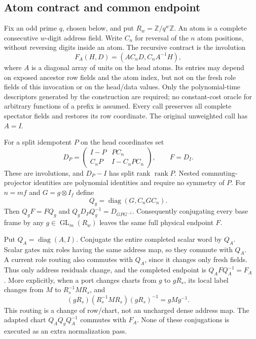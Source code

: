 \subsection{Atom contract and common endpoint}
Fix an odd prime $q$, chosen below, and put $R_w=\mathbb Z/q^w\mathbb Z$.
An atom is a complete consecutive $w$-digit address field. Write $C_n$ for
reversal of the $n$ atom positions, without reversing digits inside an atom.
The recursive contract is the involution
\[
 F_A(H,D)=(AC_nD,C_nA^{-1}H),
\]
where $A$ is a diagonal array of units on the head atoms. Its entries may
depend on exposed ancestor row fields and the atom index, but not on the
fresh role fields of this invocation or on the head/data values. Only the
polynomial-time descriptors generated by the construction are required;
no constant-cost oracle for arbitrary functions of a prefix is assumed.
Every call preserves all complete spectator fields and restores its row
coordinate. The original unweighted call has $A=I$.

For a split idempotent $P$ on the head coordinates set
\[
 D_P=\begin{pmatrix}I-P&PC_n\\C_nP&I-C_nPC_n\end{pmatrix},
 \qquad F=D_I.
\]
These are involutions, and $D_P-I$ has split rank $\operatorname{rank}P$.
Nested commuting-projector identities are polynomial identities and require
no symmetry of $P$. For $n=mf$ and $G=g\otimes I_f$ define
\[
 Q_g=\operatorname{diag}(G,C_nGC_n).
\]
Then $Q_gF=FQ_g$ and $Q_gD_PQ_g^{-1}=D_{GPG^{-1}}$.
Consequently conjugating every base frame by any $g\in\operatorname{GL}_m(R_w)$
leaves the same full physical endpoint $F$.

Put $Q_A=\operatorname{diag}(A,I)$. Conjugate the entire completed scalar
word by $Q_A$. Scalar gates mix roles having the same address map, so they
commute with $Q_A$. A current role routing also commutes with $Q_A$, since
it changes only fresh fields. Thus only address residuals change, and the
completed endpoint is $Q_AFQ_A^{-1}=F_A$. More explicitly, when a port
changes charts from $g$ to $gR_s$, its local label changes from $M$ to
$R_s^{-1}MR_s$, and
\[
 (gR_s)(R_s^{-1}MR_s)(gR_s)^{-1}=gMg^{-1}.
\]
This routing is a change of row/chart, not an uncharged dense address map.
The adapted chart $Q_AQ_gQ_A^{-1}$ commutes with $F_A$. None of these
conjugations is executed as an extra normalization pass.

